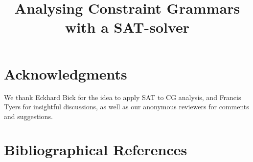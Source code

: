 \documentclass[10pt, a4paper]{article}
\title{Analysing Constraint Grammars with a SAT-solver}
\begin{document}
\maketitleabstract







\section*{Acknowledgments}
We thank Eckhard Bick for the idea to apply SAT to CG analysis, and Francis Tyers for insightful discussions, as well as our anonymous reviewers for comments and suggestions.

\section{Bibliographical References}
\label{main:ref}





\end{document}
